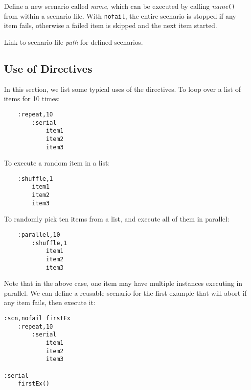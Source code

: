 
Define a new scenario called {\it name}, which can be executed by calling {\it
name}{\tt ()} from within a scenario file. With {\tt nofail}, the entire
scenario is stopped if any item fails, otherwise a failed item is skipped and
the next item started.


 Link to scenario file {\it path} for defined
scenarios.

\subsection{Use of Directives}

In this section, we list some typical uses of the directives. To loop over a
list of items for 10 times:
\begin{verbatim}
    :repeat,10
        :serial
            item1
            item2
            item3
\end{verbatim}
To execute a random item in a list:
\begin{verbatim}
    :shuffle,1
        item1
        item2
        item3
\end{verbatim}
To randomly pick ten items from a list, and execute all of them in parallel:
\begin{verbatim}
    :parallel,10
        :shuffle,1
            item1
            item2
            item3
\end{verbatim}
Note that in the above case, one item may have multiple instances executing in
parallel. We can define a reusable scenario for the first example that will
abort if any item fails, then execute it:
\begin{verbatim}
:scn,nofail firstEx
    :repeat,10
        :serial
            item1
            item2
            item3

:serial
    firstEx()
\end{verbatim}


